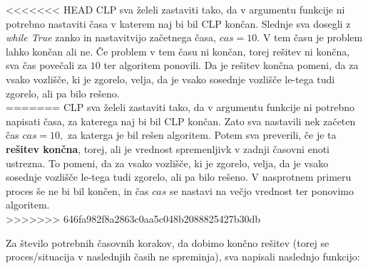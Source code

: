 \documentclass[a4paper, 12pt]{article}
\begin{document}
<<<<<<< HEAD
\noindent CLP sva želeli zastaviti tako, da v argumentu funkcije ni potrebno nastaviti časa v
katerem naj bi bil CLP končan. Slednje sva dosegli z \emph{while True} zanko in
nastavitvijo začetnega časa, $cas = 10$. V tem času je problem lahko
končan ali ne. Če problem v tem času ni končan, torej rešitev ni končna, sva čas povečali za $10$ ter
algoritem ponovili.
Da je rešitev končna pomeni, da za vsako vozlišče, ki je zgorelo, velja, da je vsako sosednje
vozlišče le-tega tudi zgorelo, ali pa bilo rešeno. \\
=======
\noindent CLP sva želeli zastaviti tako, da v argumentu funkcije ni potrebno napisati časa,
za katerega naj bi bil CLP končan. Zato sva nastavili nek začeten čas $cas = 10,$ za katerga 
je bil rešen algoritem. Potem sva preverili, če je ta \textbf{rešitev končna}, 
torej, ali je vrednost spremenljivk v zadnji časovni enoti ustrezna.
To pomeni, da za vsako vozlišče, ki je zgorelo, velja, da je vsako sosednje
vozlišče le-tega tudi zgorelo, ali pa bilo rešeno. V nasprotnem primeru 
proces še ne bi bil končen, in čas $cas$ se nastavi na večjo vrednost ter
ponovimo algoritem. \\
>>>>>>> 646fa982f8a2863c0aa5c048b2088825427b30db

\noindent Za število potrebnih časovnih korakov, da dobimo končno rešitev (torej se proces/situacija v naslednjih časih ne spreminja),
sva napisali naslednjo funkcijo:
\end{document}
